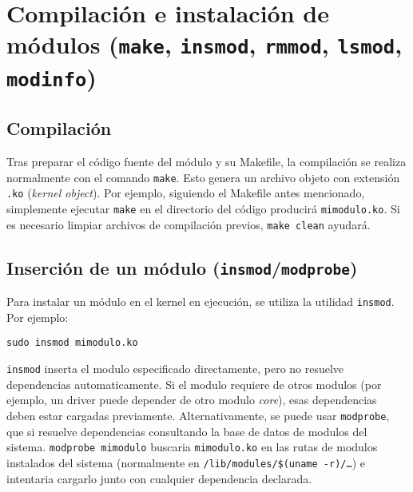 \section{Compilación e instalación de módulos (\texttt{make}, \texttt{insmod}, \texttt{rmmod}, \texttt{lsmod}, \texttt{modinfo})}
\label{sec:compilacion}

\subsection*{Compilación}
Tras preparar el código fuente del módulo y su Makefile, la compilación se realiza normalmente con el comando \texttt{make}. Esto genera un archivo objeto con extensión \texttt{.ko} (\emph{kernel object}). Por ejemplo, siguiendo el Makefile antes mencionado, simplemente ejecutar \texttt{make} en el directorio del código producirá \texttt{mimodulo.ko}. Si es necesario limpiar archivos de compilación previos, \texttt{make clean} ayudará.

\subsection*{Inserción de un módulo (\texttt{insmod}/\texttt{modprobe})}
Para instalar un módulo en el kernel en ejecución, se utiliza la utilidad \texttt{insmod}. Por ejemplo:
\begin{lstlisting}
sudo insmod mimodulo.ko
\end{lstlisting}
\texttt{insmod} inserta el modulo especificado directamente, pero no resuelve dependencias automaticamente. Si el modulo requiere de otros modulos (por ejemplo, un driver puede depender de otro modulo \emph{core}), esas dependencias deben estar cargadas previamente. Alternativamente, se puede usar \texttt{modprobe}, que si resuelve dependencias consultando la base de datos de modulos del sistema. \texttt{modprobe mimodulo} buscaria \texttt{mimodulo.ko} en las rutas de modulos instalados del sistema (normalmente en \texttt{/lib/modules/\$(uname -r)/\dots}) e intentaria cargarlo junto con cualquier dependencia declarada.

